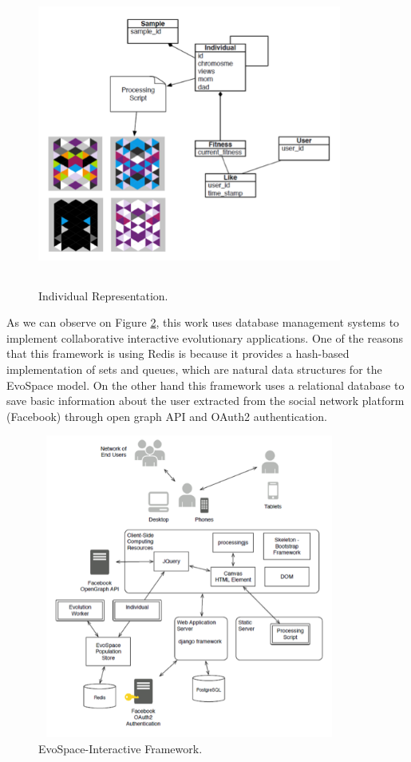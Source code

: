 \begin{figure}
	\captionsetup{justification=centering,margin=2cm}
	\centering
	\setlength\fboxsep{0pt}
	\setlength\fboxrule{0.7pt}
	\includegraphics[width=10cm,height=10cm,keepaspectratio]{img/individualRep.png}
	\caption{Individual Representation.}
	\label{fig:individualRep}
\end{figure}

As we can observe on Figure \ref{fig:ESFramework1}, this work uses database
management systems to implement collaborative interactive evolutionary
applications. One of the reasons that this framework is using Redis \cite{redis} is
because it provides a hash-based implementation of sets and queues, which are
natural data structures for the EvoSpace model. On the other hand this framework
uses a relational database to save basic information about the user extracted
from the social network platform (Facebook) through open graph API and OAuth2
authentication.
\begin{figure}
	\captionsetup{justification=centering,margin=2cm}
	\centering
	\setlength\fboxsep{0pt}
	\setlength\fboxrule{0.7pt}
	\includegraphics[width=10cm,height=10cm,keepaspectratio]{img/ESFramework.png}
	\caption{EvoSpace-Interactive Framework.}
	\label{fig:ESFramework1}
\end{figure}

